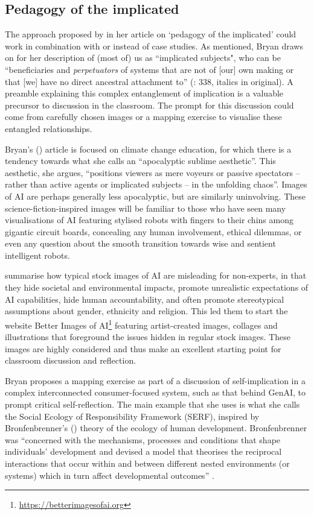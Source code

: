 \documentclass[output=paper]{langscibook}
\begin{document}
\subsection{Pedagogy of the implicated}
The approach proposed by \citet{bryan_pedagogy_2022} in her article on ‘pedagogy of the implicated’ could work in combination with or instead of case studies. As mentioned, Bryan draws on \citet{rothberg_implicated_2019} for her description of (most of) us as ``implicated subjects", who can be ``beneficiaries and \textit{perpetuators} of systems that are not of [our] own making or that [we] have no direct ancestral attachment to” (\citealt{bryan_pedagogy_2022}: 338, italics in original). A preamble explaining this complex entanglement of implication is a valuable precursor to discussion in the classroom. The prompt for this discussion could come from carefully chosen images or a mapping exercise to visualise these entangled relationships.

Bryan’s (\citeyear[341]{bryan_pedagogy_2022}) article is focused on climate change education, for which there is a tendency towards what she calls an “apocalyptic sublime aesthetic”. This aesthetic, she argues, “positions viewers as mere voyeurs or passive spectators – rather than active agents or implicated subjects – in the unfolding chaos”. Images of AI are perhaps generally less apocalyptic, but are similarly uninvolving. These science-fiction-inspired images will be familiar to those who have seen many visualisations of AI featuring stylised robots with fingers to their chins among gigantic circuit boards, concealing any human involvement, ethical dilemmas, or even any question about the smooth transition towards wise and sentient intelligent robots.

\citet{dihal_better_2023} summarise how typical stock images of AI are misleading for non-experts, in that they hide societal and environmental impacts, promote unrealistic expectations of AI capabilities, hide human accountability, and often promote stereotypical assumptions about gender, ethnicity and religion. This led them to start the website Better Images of AI\footnote{\url{https://betterimagesofai.org}} featuring artist-created images, collages and illustrations that foreground the issues hidden in regular stock images. These images are highly considered and thus make an excellent starting point for classroom discussion and reflection.

Bryan proposes a mapping exercise as part of a discussion of self-implication in a complex interconnected consumer-focused system, such as that behind GenAI, to prompt critical self-reflection. The main example that she uses is what she calls the Social Ecology of Responsibility Framework (SERF), inspired by Bronfenbrenner's (\citeyear{bronfenbrenner_ecology_2009}) theory of the ecology of human development. Bronfenbrenner was “concerned with the mechanisms, processes and conditions that shape individuals’ development and devised a model that theorises the reciprocal interactions that occur within and between different nested environments (or systems) which in turn affect developmental outcomes” \citep[338]{bryan_pedagogy_2022}. 
\end{document}
